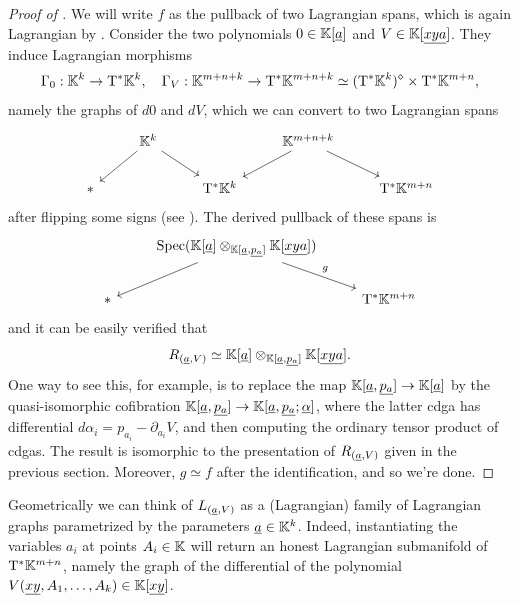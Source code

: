 \begin{proof}[Proof of ]
	We will write $f$ as the pullback of two Lagrangian spans, which is again Lagrangian by \cite[Theorem 4.4]{Calaque2015}. Consider the two polynomials $0 \in \mathbb{K}[\underline{a}]$ and $V \in \mathbb{K}[\underline{xya}]$. They induce Lagrangian morphisms
	\begin{equation*}
		\Gamma_0 : \mathbb{K}^{k} \to \mathrm{T}^\ast \mathbb{K}^k, \quad \Gamma_V : \mathbb{K}^{m+n+k} \to \mathrm{T}^\ast \mathbb{K}^{m+n+k} \simeq (\mathrm{T}^\ast \mathbb{K}^k)^\diamond \times \mathrm{T}^\ast \mathbb{K}^{m+n},
	\end{equation*}
	namely the graphs of $d0$ and $dV$, which we can convert to two Lagrangian spans
	\begin{equation*}
		\begin{tikzcd}
			& \KK^k \ar[dl] \ar[dr] & & \KK^{m+n+k} \ar[dr] \ar[dl] & \\
			\ast & & \bT^\ast \KK^k & & \bT^\ast \KK^{m+n}
		\end{tikzcd}
	\end{equation*}
	after flipping some signs (see ). The derived pullback of these spans is
	\begin{equation*}
		\begin{tikzcd}
			& \Spec (\KK[\undl{a}] \otimes_{\KK[\undl{a}, \undl{p_a}]} \KK[\undl{xya}]) \ar[dl] \ar[dr, "g"] & \\
			\ast & & \bT^\ast \KK^{m+n}
		\end{tikzcd}
	\end{equation*}
	and it can be easily verified that
	\begin{equation*}
		R_{(\underline{a}, V)} \simeq \mathbb{K}[\underline{a}] \otimes_{\mathbb{K}[\underline{a}, \underline{p_a}]} \mathbb{K}[\underline{xya}].
	\end{equation*}
	One way to see this, for example, is to replace the map $\mathbb{K}[\underline{a}, \underline{p_a}] \to \mathbb{K}[\underline{a}]$ by the quasi-isomorphic cofibration $\mathbb{K}[\underline{a}, \underline{p_a}] \to \mathbb{K}[\underline{a},\underline{p_a};\underline{\alpha}]$, where the latter cdga has differential $d\alpha_i = p_{a_i} - \partial_{a_i} V$, and then computing the ordinary tensor product of cdgas. The result is isomorphic to the presentation of $R_{(\underline{a},V)}$ given in the previous section. Moreover, $g \simeq f$ after the identification, and so we're done.
\end{proof}

Geometrically we can think of $L_{(\underline{a}, V)}$ as a (Lagrangian) family of Lagrangian graphs parametrized by the parameters $\underline{a} \in \mathbb{K}^k$. Indeed, instantiating the variables $a_i$ at points $A_i \in \mathbb{K}$ will return an honest Lagrangian submanifold of $\mathrm{T}^\ast \mathbb{K}^{m+n}$, namely the graph of the differential of the polynomial $V(\underline{xy}, A_1, \dotsc, A_k) \in \mathbb{K}[\underline{xy}]$.

